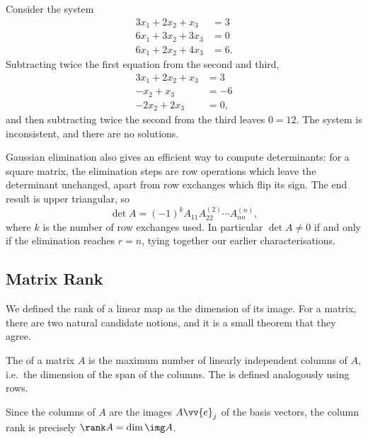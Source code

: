\begin{example}
	Consider the system
	\begin{align*}
		3x_1 + 2x_2 + x_3 &= 3 \\
		6x_1 + 3x_2 + 3x_3 &= 0 \\
		6x_1 + 2x_2 + 4x_3 &= 6.
	\end{align*}
	Subtracting twice the first equation from the second and third,
	\begin{align*}
		3x_1 + 2x_2 + x_3 &= 3 \\
		- x_2 + x_3 &= -6 \\
		- 2x_2 + 2x_3 &= 0,
	\end{align*}
	and then subtracting twice the second from the third leaves $0 = 12$. The system is inconsistent, and there are no solutions.
\end{example}

Gaussian elimination also gives an efficient way to compute determinants: for a square matrix, the elimination steps are row operations which leave the determinant unchanged, apart from row exchanges which flip its sign. The end result is upper triangular, so
$$
\det A = (-1)^k A_{11}A^{(2)}_{22}\cdots A^{(n)}_{nn},
$$
where $k$ is the number of row exchanges used. In particular $\det A \neq 0$ if and only if the elimination reaches $r = n$, tying together our earlier characterisations.

\subsection{Matrix Rank}

We defined the rank of a linear map as the dimension of its image. For a matrix, there are two natural candidate notions, and it is a small theorem that they agree.

\begin{definition}
	The  of a matrix $A$ is the maximum number of linearly independent columns of $A$, i.e.\ the dimension of the span of the columns. The  is defined analogously using rows.
\end{definition}

Since the columns of $A$ are the images $A\vv{e}_j$ of the basis vectors, the column rank is precisely $\rank A = \dim \img A$.


